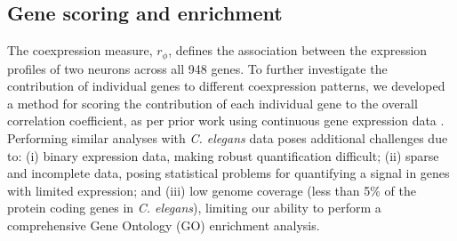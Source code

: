 \documentclass[10pt,letterpaper]{article}
\begin{document}

\subsection*{Gene scoring and enrichment}
The coexpression measure, $r_\phi$, defines the association between the expression profiles of two neurons across all 948 genes.
To further investigate the contribution of individual genes to different coexpression patterns, we developed a method for scoring the contribution of each individual gene to the overall correlation coefficient, as per prior work using continuous gene expression data \cite{Fulcher:2016ck}.
Performing similar analyses with \emph{C. elegans} data poses additional challenges due to:
(i) binary expression data, making robust quantification difficult;
(ii) sparse and incomplete data, posing statistical problems for quantifying a signal in genes with limited expression;
and (iii) low genome coverage (less than 5\% of the protein coding genes in \emph{C. elegans}), limiting our ability to perform a comprehensive Gene Ontology (GO) enrichment analysis.

\end{document}
